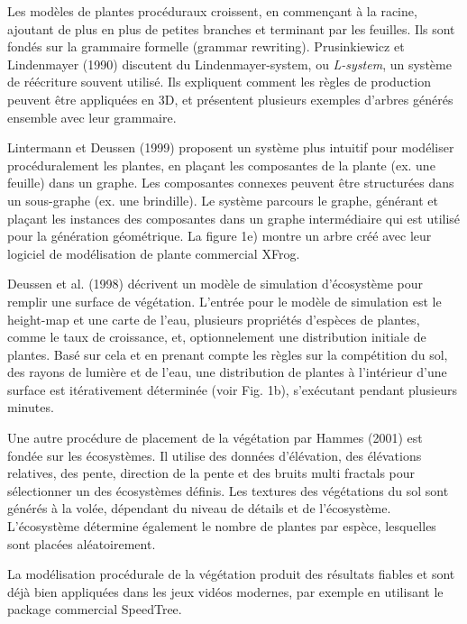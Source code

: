 \documentclass[11pt]{article}
\begin{document}
Les modèles de plantes procéduraux croissent, en commençant à la racine, ajoutant de plus en plus de petites branches et terminant par les feuilles. Ils sont fondés sur la grammaire formelle (grammar rewriting). Prusinkiewicz et Lindenmayer (1990) discutent du Lindenmayer-system, ou \textit{L-system}, un système de réécriture souvent utilisé. Ils expliquent comment les règles de production peuvent être appliquées en 3D, et présentent plusieurs exemples d'arbres générés ensemble avec leur grammaire. \newline

Lintermann et Deussen (1999) proposent un système plus intuitif  pour modéliser procéduralement les plantes, en plaçant les composantes de la plante (ex. une feuille) dans un graphe. Les composantes connexes peuvent être structurées dans un sous-graphe (ex. une brindille). Le système parcours le graphe, générant et plaçant les instances des composantes dans un graphe intermédiaire qui est utilisé pour la génération géométrique. La figure 1e) montre un arbre créé avec leur logiciel de modélisation de plante commercial XFrog.\newline

Deussen et al. (1998) décrivent un  modèle de simulation d'écosystème pour remplir une surface de végétation. L'entrée pour le modèle de simulation est le height-map et une carte de l'eau, plusieurs propriétés d'espèces de plantes, comme le taux de croissance, et, optionnelement une distribution initiale de plantes. Basé sur cela et en prenant compte  les règles sur la compétition du sol, des rayons de lumière et de l'eau, une distribution de plantes à l'intérieur d'une surface est itérativement déterminée (voir Fig. 1b), s'exécutant pendant plusieurs minutes. \newline

Une autre procédure de placement de la végétation par Hammes (2001) est fondée sur les écosystèmes. Il utilise des données d'élévation, des élévations relatives, des pente, direction de la pente et des bruits multi fractals pour sélectionner un des écosystèmes définis. Les textures des végétations du sol sont générés à la volée, dépendant du niveau de détails et de l'écosystème. L'écosystème détermine également le nombre de plantes par espèce, lesquelles sont placées aléatoirement. \newline

La modélisation procédurale de la végétation produit des résultats fiables et sont déjà bien appliquées dans les jeux vidéos modernes, par exemple en utilisant le package commercial SpeedTree.
\end{document}
